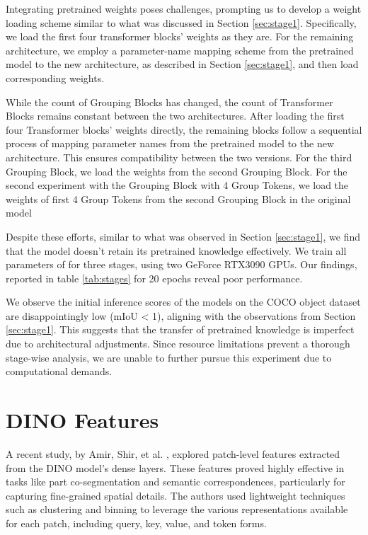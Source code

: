 Integrating pretrained weights poses challenges, prompting us to develop a weight loading scheme similar to what was discussed in Section \ref{sec:stage1}. Specifically, we load the first four transformer blocks' weights as they are. For the remaining architecture, we employ a parameter-name mapping scheme from the pretrained model to the new architecture, as described in Section \ref{sec:stage1}, and then load corresponding weights.

While the count of Grouping Blocks has changed, the count of Transformer Blocks remains constant between the two architectures. After loading the first four Transformer blocks' weights directly, the remaining blocks follow a sequential process of mapping parameter names from the pretrained model to the new architecture. This ensures compatibility between the two versions. For the third Grouping Block, we load the weights from the second Grouping Block. For the second experiment with the Grouping Block with 4 Group Tokens, we load the weights of first 4 Group Tokens from the second Grouping Block in the original model

Despite these efforts, similar to what was observed in Section \ref{sec:stage1}, we find that the model doesn't retain its pretrained knowledge effectively. We train all parameters of \gvit for three stages, using two GeForce RTX3090 GPUs. Our findings, reported in table \ref{tab:stages} for 20 epochs reveal poor performance.

We observe the initial inference scores of the models on the COCO object dataset are disappointingly low (mIoU < 1), aligning with the observations from Section \ref{sec:stage1}. This suggests that the transfer of pretrained knowledge is imperfect due to architectural adjustments. Since resource limitations prevent a thorough stage-wise analysis, we are unable to further pursue this experiment due to computational demands.


\section{DINO Features}

A recent study, by Amir, Shir, et al. \cite{amir2021deep}, explored patch-level features extracted from the DINO model's dense layers. These features proved highly effective in tasks like part co-segmentation and semantic correspondences, particularly for capturing fine-grained spatial details. The authors used lightweight techniques such as clustering and binning to leverage the various representations available for each patch, including query, key, value, and token forms.


